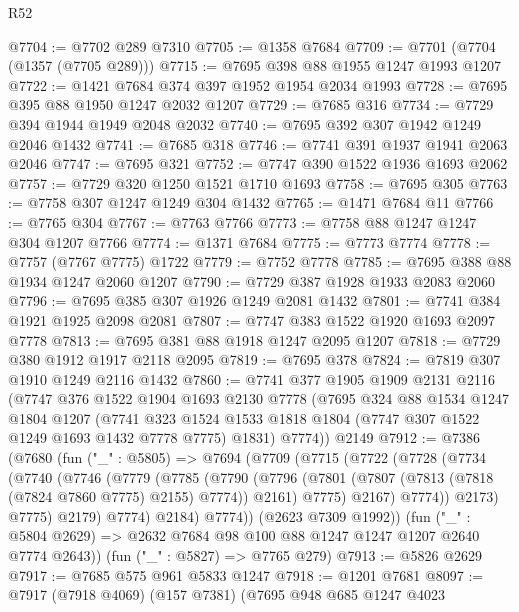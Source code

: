 \begin{lexlean}{R52}
\begin{coremodule}
@7704 := @7702 @289 @7310
@7705 := @1358 @7684
@7709 := @7701 (@7704 (@1357 (@7705 @289)))
@7715 := @7695 @398 @88 @1955 @1247 @1993 @1207
@7722 := @1421 @7684 @374 @397 @1952 @1954 @2034 @1993
@7728 := @7695 @395 @88 @1950 @1247 @2032 @1207
@7729 := @7685 @316
@7734 := @7729 @394 @1944 @1949 @2048 @2032
@7740 := @7695 @392 @307 @1942 @1249 @2046 @1432
@7741 := @7685 @318
@7746 := @7741 @391 @1937 @1941 @2063 @2046
@7747 := @7695 @321
@7752 := @7747 @390 @1522 @1936 @1693 @2062
@7757 := @7729 @320 @1250 @1521 @1710 @1693
@7758 := @7695 @305
@7763 := @7758 @307 @1247 @1249 @304 @1432
@7765 := @1471 @7684 @11
@7766 := @7765 @304
@7767 := @7763 @7766
@7773 := @7758 @88 @1247 @1247 @304 @1207 @7766
@7774 := @1371 @7684
@7775 := @7773 @7774
@7778 := @7757 (@7767 @7775) @1722
@7779 := @7752 @7778
@7785 := @7695 @388 @88 @1934 @1247 @2060 @1207
@7790 := @7729 @387 @1928 @1933 @2083 @2060
@7796 := @7695 @385 @307 @1926 @1249 @2081 @1432
@7801 := @7741 @384 @1921 @1925 @2098 @2081
@7807 := @7747 @383 @1522 @1920 @1693 @2097 @7778
@7813 := @7695 @381 @88 @1918 @1247 @2095 @1207
@7818 := @7729 @380 @1912 @1917 @2118 @2095
@7819 := @7695 @378
@7824 := @7819 @307 @1910 @1249 @2116 @1432
@7860 := @7741
    @377
    @1905
    @1909
    @2131
    @2116
    (@7747
      @376
      @1522
      @1904
      @1693
      @2130
      @7778
      (@7695
        @324
        @88
        @1534
        @1247
        @1804
        @1207
        (@7741 @323 @1524 @1533 @1818 @1804 (@7747 @307 @1522 @1249 @1693 @1432 @7778 @7775) @1831)
        @7774))
    @2149
@7912 := @7386
    (@7680
      (fun ("_" : @5805) =>
      @7694
        (@7709
          (@7715
            (@7722
              (@7728
                (@7734
                  (@7740
                    (@7746
                      (@7779
                        (@7785
                          (@7790
                            (@7796
                              (@7801 (@7807 (@7813 (@7818 (@7824 @7860 @7775) @2155) @7774)) @2161)
                              @7775)
                            @2167)
                          @7774))
                      @2173)
                    @7775)
                  @2179)
                @7774)
              @2184)
            @7774))
        (@2623 @7309 @1992))
      (fun ("_" : @5804 @2629) => @2632 @7684 @98 @100 @88 @1247 @1247 @1207 @2640 @7774 @2643))
    (fun ("_" : @5827) => @7765 @279)
@7913 := @5826 @2629
@7917 := @7685 @575 @961 @5833 @1247
@7918 := @1201 @7681
@8097 := @7917
    (@7918 @4069)
    (@157 @7381)
    (@7695
      @948
      @685
      @1247
      @4023

\end{coremodule}
\end{lexlean}
